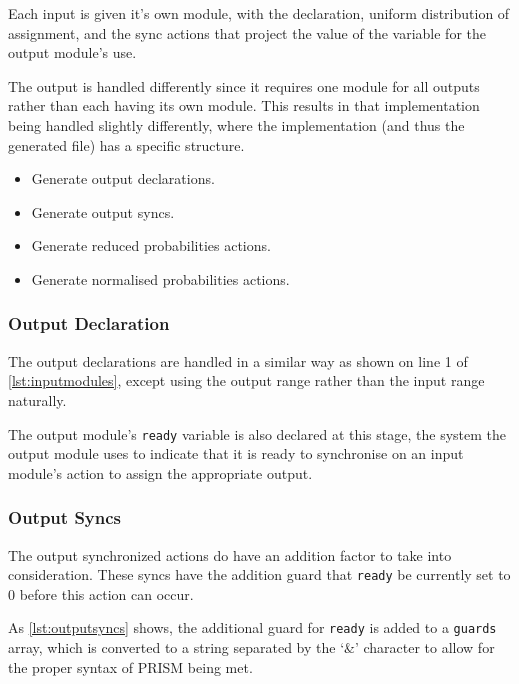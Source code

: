 \documentclass[report.tex]{subfiles}
\begin{document}
Each input is given it's own module, with the declaration, uniform distribution
of assignment, and the sync actions that project the value of the variable for
the output module's use.

The output is handled differently since it requires one module for all outputs
rather than each having its own module. This results in that implementation
being handled slightly differently, where the implementation (and thus the
generated file) has a specific structure.
\begin{itemize}
    \item Generate output declarations.
    \item Generate output syncs.
    \item Generate reduced probabilities actions.
    \item Generate normalised probabilities actions.
\end{itemize}

\subsubsection{Output Declaration} %
\label{ssub:output_dec_impl}
The output declarations are handled in a similar way as shown on line  1 of
\ref{lst:inputmodules}, except using the output range rather than the input
range naturally.

The output module's \texttt{ready} variable is also declared at this stage,
the system the output module uses to indicate that it is ready to synchronise
on an input module's action to assign the appropriate output.

\subsubsection{Output Syncs} %
\label{ssub:output_syncs}
The output synchronized actions do have an addition factor to take into
consideration. These syncs have the addition guard that \texttt{ready} be
currently set to 0 before this action can occur.



As \ref{lst:outputsyncs} shows, the additional guard for \texttt{ready} is
added to a \texttt{guards} array, which is converted to a string separated by
the `\&' character to allow for the proper syntax of PRISM being met.
\end{document}
